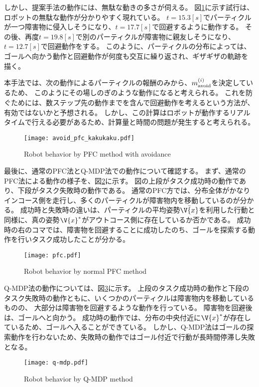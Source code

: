 しかし、提案手法の動作には、無駄な動きの多さが伺える。
図\ref{fig:avoid pfc kakukaku}に示す試行は、ロボットの無駄な動作が分かりやすく現れている。
$t=15.3[\si{s}]$でパーティクルが一つ障害物に侵入しそうになり、$t=17.7[\si{s}]$で回避するように動作する。
その後、再度$t=19.8[\si{s}]$で別のパーティクルが障害物に親友しそうになり、$t=12.7[\si{s}]$で回避動作をする。
このように、パーティクルの分布によっては、ゴールへ向かう動作と回避動作が何度も交互に繰り返され、ギザギザの軌跡を描く。

本手法では、次の動作によるパーティクルの報酬のみから、$m^{(i)}_{\rm avoid}$を決定しているため、
このようにその場しのぎのような動作になると考えられる。
これを防ぐためには、数ステップ先の動作までを含んで回避動作を考えるという方法が、有効ではないかと予想される。
しかし、この計算はロボットが動作するリアルタイムで行える必要があるため、計算量と時間の問題が発生すると考えられる。

\begin{figure}[H]
  \begin{center}
    \texttt{[image: avoid\_pfc\_kakukaku.pdf]}
    \caption{Robot behavior by PFC method with avoidance}
    \label{fig:avoid pfc kakukaku}
  \end{center}
\end{figure}

最後に、通常のPFC法とQ-MDP法での動作について確認する。
まず、通常のPFC法による動作の様子を、図\ref{fig:pfc}に示す。
図の上段がタスク成功時の動作であり、下段がタスク失敗時の動作である。
通常のPFC方では、分布全体がかなりインコース側を走行し、多くのパーティクルが障害物内を移動しているのが分かる。
成功時と失敗時の違いは、パーティクルの平均姿勢$\bar{\V{x}}$を利用した行動と同様に、真の姿勢$\V{x}^{*}$がアウトコース側に存在しているか否かである。
成功時の右のコマでは、障害物を回避することに成功したのち、ゴールを探索する動作を行いタスク成功したことが分かる。

\begin{figure}[H]
  \begin{center}
    \texttt{[image: pfc.pdf]}
    \caption{Robot behavior by normal PFC method}
    \label{fig:pfc}
  \end{center}
\end{figure}

Q-MDP法の動作については、図\ref{fig:q-mdp}に示す。
上段のタスク成功時の動作と下段のタスク失敗時の動作ともに、いくつかのパーティクルは障害物内を移動しているものの、
大部分は障害物を回避するような動作を行っている。
障害物を回避後は、ゴールへと向かう。
成功時の動作では、分布の中央付近に$\V{x}^{*}$が存在しているため、ゴールへ入ることができている。
しかし、Q-MDP法はゴールの探索動作を行わないため、失敗時の動作ではゴール付近で行動が長時間停滞し失敗となる。

\begin{figure}[H]
  \begin{center}
    \texttt{[image: q-mdp.pdf]}
    \caption{Robot behavior by Q-MDP method}
    \label{fig:q-mdp}
  \end{center}
\end{figure}

